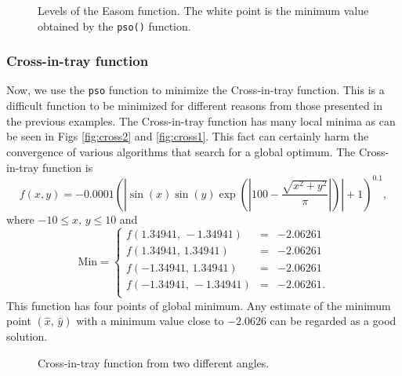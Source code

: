 \documentclass[10pt,letterpaper]{article}
\begin{document}
\begin{figure}[H]
\centering
\caption{Levels of the Easom function.
The white point is the minimum value obtained by the \texttt{pso()} function.}
\label{curves_easom}
\end{figure}

\subsubsection{Cross-in-tray function}

Now, we use the \texttt{pso} function to minimize the Cross-in-tray function.
This is a difficult function to be minimized for different reasons from
those presented in the previous examples.
The Cross-in-tray function has many local minima as  can be seen in Figs \ref{fig:cross2}
and \ref{fig:cross1}.
This fact can certainly harm the convergence of various algorithms that search for a global optimum.
The Cross-in-tray function is
$$f(x,y) = -0.0001 \left(\left| \sin(x) \sin(y) \exp\left({\left|100 - \frac{\sqrt{x^2 + y^2}}{\pi}\right|}\right)\right| +1 \right)^{0.1},$$
where $-10 \leq x,\, y \leq 10$ and
$$
\mathrm{Min} = \left\{
\begin{array}{ccc}
f(1.34941,\,-1.34941) & = & -2.06261
\\
f(1.34941,\,1.34941) & = & -2.06261
\\
f(-1.34941,\,1.34941) & = & -2.06261
\\
f(-1.34941,\,-1.34941) & = & -2.06261.
\\
\end{array}
\right.
$$
This function has four points of global minimum.
Any estimate of the minimum point $(\widehat{x},\,\widehat{y})$ with a minimum value close to $-2.0626$ can be regarded as a good solution.

\begin{figure}[H]
\centering
\subfigure{
	\label{fig:cross2}
}
\subfigure{
	\label{fig:cross1}
}
\caption{Cross-in-tray function from two different angles.}
\label{fig:cross}
\end{figure}
\end{document}
